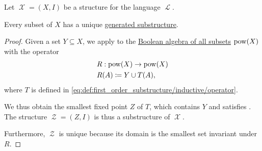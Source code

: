 \begin{proposition}\label{thm:first_order_generated_substructures_exist}
  Let \( \mscrX = (X, I) \) be a structure for the language \( \mscrL \).

  Every subset of \( X \) has a unique \hyperref[def:first_order_generated_substructure]{generated substructure}.
\end{proposition}
\begin{proof}
  Given a set \( Y \subseteq X \), we apply  to the \hyperref[thm:boolean_algebra_of_subsets]{Boolean algebra of all subsets} \( \operatorname{pow}(X) \) with the operator
  \begin{equation*}
    \begin{aligned}
      &R: \operatorname{pow}(X) \to \operatorname{pow}(X) \\
      &R(A) \coloneqq Y \cup T(A),
    \end{aligned}
  \end{equation*}
  where \( T \) is defined in \eqref{eq:def:first_order_substructure/inductive/operator}.

  We thus obtain the smallest fixed point \( Z \) of \( T \), which contains \( Y \) and satisfies . The structure \( \mscrZ = (Z, I) \) is thus a substructure of \( \mscrX \).

  Furthermore, \( \mscrZ \) is unique because its domain is the smallest set invariant under \( R \).
\end{proof}

